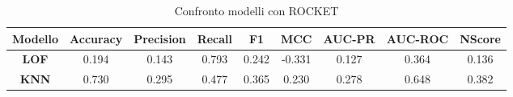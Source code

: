 \begin{table}[h!]
    \centering
    \begin{adjustbox}{max width=\textwidth}
        \begin{tabular}{|c|c|c|c|c|c|c|c|c|}
        \hline
        \textbf{Modello} & \textbf{Accuracy} &\textbf{Precision}  & \textbf{Recall} & \textbf{F1} & \textbf{MCC} & \textbf{AUC-PR} & \textbf{AUC-ROC} & \textbf{NScore}\\
        \hline
        \textbf{LOF} & 0.194 & 0.143 & 0.793 &0.242  & -0.331 & 0.127 & 0.364 & 0.136 \\
        \hline
         \textbf{KNN} & 0.730 & 0.295 & 0.477 &0.365  & 0.230 & 0.278& 0.648 &0.382 \\
         \hline
        \end{tabular}
    \end{adjustbox}
    \caption{Confronto modelli con ROCKET}
    \label{tab:LOF_KNN}
\end{table}

